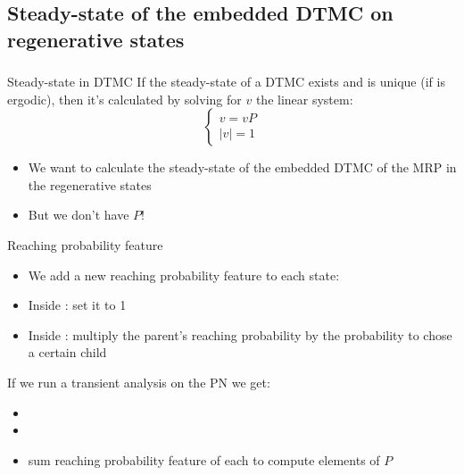 \subsection{Steady-state of the embedded \acs{DTMC} on regenerative
  states}
\begin{frame}
  \frametitle{\insertsubsection}
  \begin{block}{Steady-state in \acf{DTMC}}
    If the steady-state of a \acf{DTMC} exists and is unique (if is
    \alert{ergodic}), then it's calculated by solving for $v$ the linear
    system:\alert{
    \begin{equation*}
      \begin{cases}
        v=vP\\
        |v| = 1
      \end{cases}
    \end{equation*}
  }
  \end{block}
  \pause
  \begin{itemize}
  \item We want to calculate the \alert{steady-state} of the embedded \acs{DTMC} of the \acs{MRP} in
    the \alert{regenerative states}
    \pause
  \item But we don't have \alert{$P$}! 
  \end{itemize}
\end{frame}

\begin{frame}
  \begin{block}{Reaching probability feature}
    \begin{itemize}
    \item We add a new \alert{reaching probability feature} to each
      state: 
    \item Inside : set it to
      1
    \item Inside : multiply the
      parent's reaching probability by the probability to chose a
      certain child
    \end{itemize}
  \end{block}
  If we run a transient analysis on the \acf{PN} we get:
  \begin{itemize}
  \item {}
  \item {\scriptsize{}}
  \item sum reaching probability feature of each  to compute
    elements of \alert{$P$}
  \end{itemize}
\end{frame}


